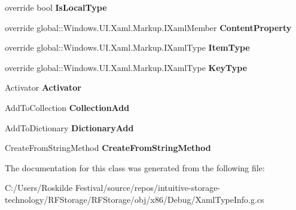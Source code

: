 \begin{DoxyCompactItemize}
\mbox{\label{class_r_f_storage_1_1_r_f_storage___xaml_type_info_1_1_xaml_user_type_a6a708559a2e12ced78415cfbedca015c}} 
override bool {\bfseries Is\+Local\+Type}\hspace{0.3cm}{\ttfamily  [get]}
\item 
\mbox{\label{class_r_f_storage_1_1_r_f_storage___xaml_type_info_1_1_xaml_user_type_a1c66f797db2210479d072c7b83a60b08}} 
override global\+::\+Windows.\+U\+I.\+Xaml.\+Markup.\+I\+Xaml\+Member {\bfseries Content\+Property}\hspace{0.3cm}{\ttfamily  [get]}
\item 
\mbox{\label{class_r_f_storage_1_1_r_f_storage___xaml_type_info_1_1_xaml_user_type_a2e20cbd1b20b53293de887020d49394a}} 
override global\+::\+Windows.\+U\+I.\+Xaml.\+Markup.\+I\+Xaml\+Type {\bfseries Item\+Type}\hspace{0.3cm}{\ttfamily  [get]}
\item 
\mbox{\label{class_r_f_storage_1_1_r_f_storage___xaml_type_info_1_1_xaml_user_type_ae8cf8964a923e76d6d77ffd1386192d8}} 
override global\+::\+Windows.\+U\+I.\+Xaml.\+Markup.\+I\+Xaml\+Type {\bfseries Key\+Type}\hspace{0.3cm}{\ttfamily  [get]}
\item 
\mbox{\label{class_r_f_storage_1_1_r_f_storage___xaml_type_info_1_1_xaml_user_type_aa7607d5098d0a641d0ec26acfe385063}} 
Activator {\bfseries Activator}\hspace{0.3cm}{\ttfamily  [get, set]}
\item 
\mbox{\label{class_r_f_storage_1_1_r_f_storage___xaml_type_info_1_1_xaml_user_type_a76510aafdd5d63f545aab66c10292ef5}} 
Add\+To\+Collection {\bfseries Collection\+Add}\hspace{0.3cm}{\ttfamily  [get, set]}
\item 
\mbox{\label{class_r_f_storage_1_1_r_f_storage___xaml_type_info_1_1_xaml_user_type_afdae89afa00220f90cab890ae51f8f13}} 
Add\+To\+Dictionary {\bfseries Dictionary\+Add}\hspace{0.3cm}{\ttfamily  [get, set]}
\item 
\mbox{\label{class_r_f_storage_1_1_r_f_storage___xaml_type_info_1_1_xaml_user_type_af66661e67cd09b0d90bbef10f8926ae2}} 
Create\+From\+String\+Method {\bfseries Create\+From\+String\+Method}\hspace{0.3cm}{\ttfamily  [get, set]}
\end{DoxyCompactItemize}


The documentation for this class was generated from the following file\+:\begin{DoxyCompactItemize}
\item 
C\+:/\+Users/\+Roskilde Festival/source/repos/intuitive-\/storage-\/technology/\+R\+F\+Storage/\+R\+F\+Storage/obj/x86/\+Debug/Xaml\+Type\+Info.\+g.\+cs\end{DoxyCompactItemize}

